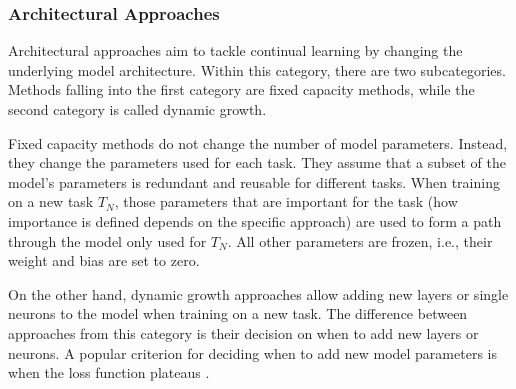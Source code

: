 \subsubsection{Architectural Approaches}
\label{sec:ArchitecturalApproaches}
Architectural approaches aim to tackle continual learning by changing the underlying model architecture. Within this category, there are two  
subcategories. Methods falling into the first category are fixed capacity methods, while the second category is called
dynamic growth. \par
Fixed capacity methods do not change the number of model parameters. Instead, they change the parameters used for each task. They assume that
a subset of the model's parameters is redundant and reusable for different tasks. When training on a new task $T_N$, those parameters that are
important for the task (how importance is defined depends on the specific approach) are used to form a path through the model only used for
$T_N$. All other parameters are frozen, i.e., their weight and bias are set to zero. \par
On the other hand, dynamic growth approaches allow adding new layers or single neurons to the model when training on a new task. The difference between
approaches from this category is their decision on when to add new layers or neurons. A popular criterion for deciding when to add new model
parameters is when the loss function plateaus \cite{ash1989dynamic}.

